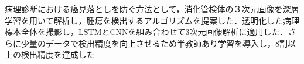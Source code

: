 病理診断における癌見落としを防ぐ方法として，消化管検体の３次元画像を深層学習を用いて解析し，腫瘍を検出するアルゴリズムを提案した．透明化した病理標本全体を撮影し，LSTMとCNNを組み合わせて3次元画像解析に適用した．さらに少量のデータで検出精度を向上させるため半教師あり学習を導入し，8割以上の検出精度を達成した